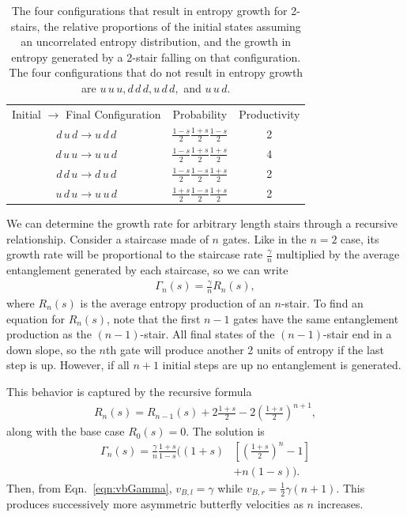 \documentclass[aps,prx,reprint,superscriptaddress, longbibliography]{revtex4-1}
\newcommand{\half}{\frac{1}{2}}
\begin{document}
\begin{table}
	\centering
	\begin{tabular}{ccc}
		Initial $\to$ Final 
		Configuration        & Probability         & Productivity\\
		$d\,u\,d\to u\,d\,d$ & $\frac{1-s}{2}\frac{1+s}{2}\frac{1-s}{2}$ & 2\\
		$d\,u\,u\to u\,u\,d$ & $\frac{1-s}{2}\frac{1+s}{2}\frac{1+s}{2}$ & 4\\
		$d\,d\,u\to d\,u\,d$ & $\frac{1-s}{2}\frac{1-s}{2}\frac{1+s}{2}$ & 2\\
		$u\,d\,u\to u\,u\,d$ & $\frac{1+s}{2}\frac{1-s}{2}\frac{1+s}{2}$ & 2
	\end{tabular}
	\caption{The four configurations that result in entropy growth for 2-stairs, the relative proportions of the initial states assuming an uncorrelated entropy distribution, and the growth in entropy generated by a 2-stair falling on that configuration. The four configurations that do not result in entropy growth are $u\,u\,u, d\,d\,d, u\,d\,d,$ and $u\,u\,d$.}
	\label{tab:2stair}
\end{table}

We can determine the growth rate for arbitrary length stairs through a recursive relationship. Consider a staircase made of $n$ gates. Like in the $n=2$ case, its growth rate will be proportional to the staircase rate $\frac{\gamma}{n}$ multiplied by the average entanglement generated by each staircase, so we can write
\begin{align}
\Gamma_n(s) = \frac{\gamma}{n}R_n(s), \label{eqn:growthrate}
\end{align}
where $R_n(s)$ is the average entropy production of an $n$-stair. To find an equation for $R_n(s)$, note that the first $n-1$ gates have the same entanglement production as the $(n-1)$-stair. All final states of the $(n-1)$-stair end in a down slope, so the $n$th gate will produce another 2 units of entropy if the last step is up. However, if all $n+1$ initial steps are up no entanglement is generated. 

This behavior is captured by the recursive formula
\begin{align}
R_n(s) = R_{n-1}(s)+2\frac{1+s}{2} - 2\left(\frac{1+s}{2}\right)^{n+1}, \label{eqn:raterecur}
\end{align}
along with the base case $R_0(s)=0$. The solution is
\begin{align}
\Gamma_n(s) = \frac{\gamma}{n}\frac{1+s}{1-s}\bigg(
(1+s)&\left[\left(\frac{1+s}{2}\right)^n-1\right]\nonumber \\
&+n(1-s)\bigg). \label{eqn:growthrate}
\end{align}
Then, from Eqn.~\ref{eqn:vbGamma}, $v_{B,l}=\gamma$ while $v_{B,r}=\half\gamma(n+1)$.
This produces successively more asymmetric butterfly velocities as $n$ increases. 
\end{document}
